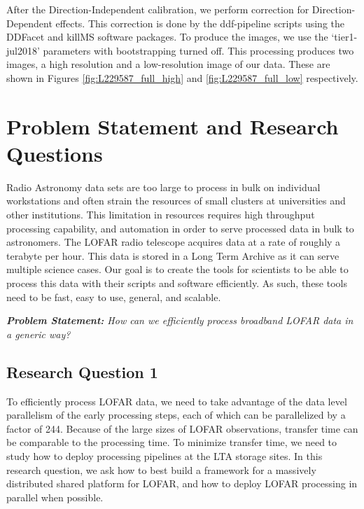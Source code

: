 After the Direction-Independent calibration, we perform correction for Direction-Dependent effects. This correction is done by the ddf-pipeline scripts using the DDFacet and killMS software packages. To produce the images, we use the `tier1-jul2018' parameters with bootstrapping turned off. This processing produces two images, a high resolution and a low-resolution image of our data. These are shown in Figures \ref{fig:L229587_full_high} and \ref{fig:L229587_full_low} respectively. 

\section{Problem Statement and Research Questions}

Radio Astronomy data sets are too large to process in bulk on individual workstations and often strain the resources of small clusters at universities and other institutions. This limitation in resources requires high throughput processing capability, and automation in order to serve processed data in bulk to astronomers. The LOFAR radio telescope acquires data at a rate of roughly a terabyte per hour. This data is stored in a Long Term Archive as it can serve multiple science cases. Our goal is to create the tools for scientists to be able to process this data with their scripts and software efficiently. As such, these tools need to be fast, easy to use, general, and scalable. 

\begin{addmargin}[4em]{8em}%
    \emph{\textbf{Problem Statement:} How can we efficiently process broadband LOFAR data in a generic way?} 
\end{addmargin}



\subsection{Research Question 1}

To efficiently process LOFAR data, we need to take advantage of the data level parallelism of the early processing steps, each of which can be parallelized by a factor of 244. Because of the large sizes of LOFAR observations, transfer time can be comparable to the processing time. To minimize transfer time, we need to study how to deploy processing pipelines at the LTA storage sites. In this research question, we ask how to best build a framework for a massively distributed shared platform for LOFAR, and how to deploy LOFAR processing in parallel when possible.

